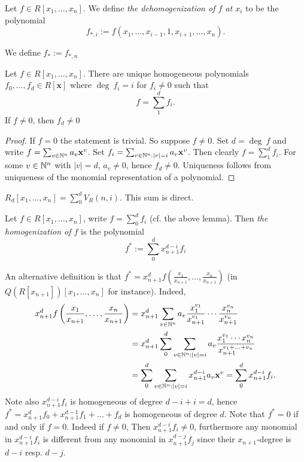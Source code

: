 \begin{definition}
    Let $f\in R[x_1,\dots,x_{n}]$. We define \textit{the dehomogenization of $f$ at $x_i$} to be the polynomial 
    $$f_{\ast,i}:=f(x_1,\dots,x_{i-1},1,x_{i+1},\dots,x_n).$$
\end{definition}
\begin{remark}
    We define $f_\ast := f_{\ast,n}$
\end{remark}
\begin{lemma}
    Let $f\in R[x_1,\dots,x_n]$. There are unique homogeneous polynomials $f_0,\dots,f_d\in R[\mathbf{x}]$ where $\deg\ f_i = i$ for $f_i\neq0$ such that
    $$f=\sum_1^d f_i.$$
    If $f\neq 0$, then $f_d\neq 0$
\end{lemma}
\begin{proof}
    If $f=0$ the statement is trivial. So suppose $f\neq 0$. Set $d=\deg \ f$ and write $f=\sum_{v\in \mathbb{N}^n} a_v\mathbf{x}^v$. Set $f_i=\sum_{v\in \mathbb{N}^n:\vert v\vert =i} a_v\mathbf{x}^v$. Then clearly $f=\sum_1^d f_i$. For some $v\in \mathbb{N}^n$ with $\vert v \vert = d$, $a_v\neq0 $, hence $f_d\neq0$. Uniqueness follows from uniqueness of the monomial representation of a polynomial.  
\end{proof}
\begin{corollary}
    $R_d[x_1,\dots,x_n]=\sum_0^d V_R(n,i)$. This sum is direct. 
\end{corollary}
\begin{definition}
    Let $f\in R[x_1,\dots, x_n]$, write $f=\sum_0^df_i$ (cf. the above lemma). Then \textit{the homogenization of $f$} is the polynomial
    $$f^\ast := \sum_0^d x_{n+1}^{d-i}f_i $$
\end{definition}
\begin{remark}\label{AnAlternativeDefinitionAndPreimageOfHomogenizationOfZeroIsZero}
    An alternative definition is that $f^\ast = x_{n+1}^df\left(\frac{x_1}{x_{n+1}},\dots,\frac{x_n}{x_{n+1}}\right)$ (in $Q(R[x_{n+1}])[x_1,\dots,x_n]$ for instance). Indeed,
    \begin{align*}
        x_{n+1}^df\left(\frac{x_1}{x_{n+1}},\dots,\frac{x_n}{x_{n+1}}\right) &= x_{n+1}^d\sum_{v\in \mathbb{N}^n} a_v\frac{x_1^{v_1}}{x_{n+1}^{v_1}}\cdots \frac{x_n^{v_n}}{x_{n+1}^{v_n}}\\ &=x_{n+1}^d\sum_{0}^d \sum_{v\in \mathbb{N}^n: \vert v\vert =i} a_v\frac{x_1^{v_1}\cdots x_n^{v_n}}{x_{n+1}^{v_1+\dots + v_n}}\\ 
        &= \sum_0^d \sum_{v\in\mathbb{N}^n:\vert v\vert =i} x_{n+1}^{d-i} a_v\mathbf{x}^v = \sum_0^d x_{n+1}^{d-i}f_i.
    \end{align*}
    Note also $x_{n+1}^{d-i}f_i$ is homogeneous of degree $d-i+i=d$, hence $f^\ast=x_{n+1}^d f_0+x_{n+1}^{d-1}f_1+\dots+f_d$ is homogeneous of degree $d$. Note that $f^\ast = 0$ if and only if $f = 0$. Indeed if $f\neq 0$, Then $x_{n+1}^{d-i}f_i\neq 0$, furthermore any monomial in $x_{n+1}^{d-i}f_i$ is different from any monomial in $x_{n+1}^{d-j} f_j$ since their $x_{n+1}$-degree is $d-i$ resp. $d-j$. 
\end{remark}
